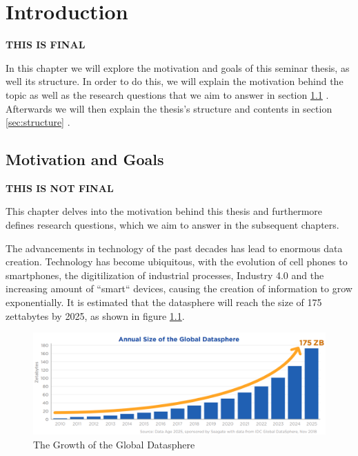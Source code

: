 \chapter{Introduction}
\label{cha:Introduction} %
\textbf{\color{green}THIS IS FINAL}

In this chapter we will explore the motivation and goals of this seminar thesis, as well its structure.
In order to do this, we will explain the motivation behind the topic as well as the research questions that we aim to answer in section \ref{sec:motivation-goals} .
Afterwards we will then explain the thesis's structure and contents in section \ref{sec:structure} .

\section{Motivation and Goals}
\label{sec:motivation-goals}
\textbf{\color{red}THIS IS NOT FINAL}

This chapter delves into the motivation behind this thesis and furthermore defines research questions, which we aim to answer in the subsequent chapters.

The advancements in technology of the past decades has lead to enormous data creation. Technology has become ubiquitous, 
with the evolution of cell phones to smartphones, the digitilization of industrial processes, Industry 4.0
and the increasing amount of ``smart`` devices, causing the creation of information to grow exponentially.
It is estimated that the \gls{datasphere} will reach the size of 175 zettabytes by 2025, as shown in figure \ref{fig:growth_datasphere}.
\begin{figure}[ht]
\centering
\includegraphics[width=1.0\textwidth]{Bilder/size_global_datasphere.png}
\caption{The Growth of the Global Datasphere \cite[p.6]{idc-seagate-data}}
\label{fig:growth_datasphere}
\end{figure}

